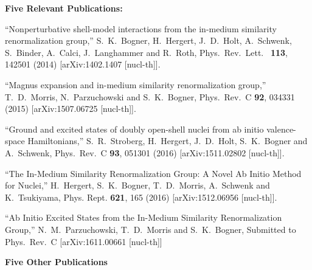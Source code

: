 \noindent
{\bf Five Relevant Publications:}
\vspace*{-8pt}

\begin{numberedlist}

\item
``Nonperturbative shell-model interactions from the in-medium similarity renormalization group,''
S.~K.~Bogner, H.~Hergert, J.~D.~Holt, A.~Schwenk, S.~Binder, A.~Calci, J.~Langhammer and R.~Roth,
Phys.\ Rev.\ Lett. \ {\bf 113}, 142501 (2014)
[arXiv:1402.1407 [nucl-th]].
\item
``Magnus expansion and in-medium similarity renormalization group,''
T.~D.~Morris, N.~Parzuchowski and S.~K.~Bogner,
Phys.\ Rev.\ C {\bf 92}, 034331 (2015)
[arXiv:1507.06725 [nucl-th]].
\item
``Ground and excited states of doubly open-shell nuclei from ab initio valence-space Hamiltonians,''
S.~R.~Stroberg, H.~Hergert, J.~D.~Holt, S.~K.~Bogner and A.~Schwenk,
Phys.\ Rev.\ C {\bf 93}, 051301 (2016)
[arXiv:1511.02802 [nucl-th]].
\item
``The In-Medium Similarity Renormalization Group: A Novel Ab Initio Method for Nuclei,''
H.~Hergert, S.~K.~Bogner, T.~D.~Morris, A.~Schwenk and K.~Tsukiyama,
Phys. Rept. {\bf 621}, 165 (2016)
[arXiv:1512.06956 [nucl-th]].
\item
``Ab Initio Excited States from the In-Medium Similarity Renormalization Group,''
N.~M.~Parzuchowski, T.~D.~Morris and S.~K.~Bogner,
Submitted to Phys.\ Rev.\ C
[arXiv:1611.00661 [nucl-th]]







\end{numberedlist}


\noindent
{\bf Five Other Publications}
\vspace*{-8pt}

